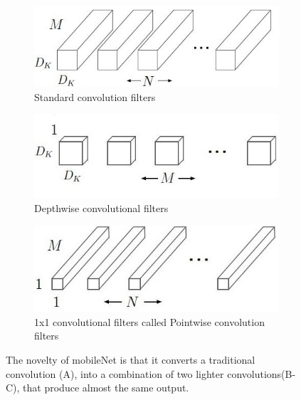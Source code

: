 \begin{figure}[!h]
	\centering
	\begin{subfigure}{0.32\textwidth}
		\includegraphics[width=\linewidth]{images/detection/architecture_mobileNet1}
		\caption{Standard convolution filters}
		\label{fig:sub_architecture_mobileNet1}
	\end{subfigure}
	\begin{subfigure}{0.32\textwidth}
		\includegraphics[width=\linewidth]{images/detection/architecture_mobileNet2}
		\caption{Depthwise convolutional filters}
		\label{fig:sub_architecture_mobileNet2}
	\end{subfigure}
	\begin{subfigure}{0.32\textwidth}
		\includegraphics[width=\linewidth]{images/detection/architecture_mobileNet3}
		\caption{1x1 convolutional filters called Pointwise convolution filters}
		\label{fig:sub_architecture_mobileNet3}
	\end{subfigure}
	\caption{The novelty of mobileNet is that it converts a traditional convolution (A), into a combination of two lighter convolutions(B-C), that produce almost the same output.}
	\label{fig:architecture_mobileNet}
\end{figure}


